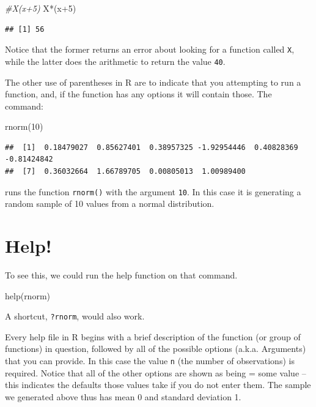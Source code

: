 \documentclass[
]{book}
\newenvironment{Shaded}{\begin{snugshade}}{\end{snugshade}}
\newcommand{\CommentTok}[1]{\textcolor[rgb]{0.56,0.35,0.01}{\textit{#1}}}
\newcommand{\DecValTok}[1]{\textcolor[rgb]{0.00,0.00,0.81}{#1}}
\newcommand{\FunctionTok}[1]{\textcolor[rgb]{0.00,0.00,0.00}{#1}}
\newcommand{\NormalTok}[1]{#1}
\newcommand{\SpecialCharTok}[1]{\textcolor[rgb]{0.00,0.00,0.00}{#1}}
\begin{document}
\begin{Shaded}
\begin{Highlighting}[]
\CommentTok{\#X(x+5)}
\NormalTok{X}\SpecialCharTok{*}\NormalTok{(x}\SpecialCharTok{+}\DecValTok{5}\NormalTok{)}
\end{Highlighting}
\end{Shaded}

\begin{verbatim}
## [1] 56
\end{verbatim}

Notice that the former returns an error about looking for a function called \texttt{X}, while the latter does the arithmetic to return the value \texttt{40}.

The other use of parentheses in R are to indicate that you attempting to run a function, and, if the function has any options it will contain those. The command:

\begin{Shaded}
\begin{Highlighting}[]
\FunctionTok{rnorm}\NormalTok{(}\DecValTok{10}\NormalTok{)}
\end{Highlighting}
\end{Shaded}

\begin{verbatim}
##  [1]  0.18479027  0.85627401  0.38957325 -1.92954446  0.40828369 -0.81424842
##  [7]  0.36032664  1.66789705  0.00805013  1.00989400
\end{verbatim}

runs the function \texttt{rnorm()} with the argument \texttt{10}. In this case it is generating a random sample of 10 values from a normal distribution.

\hypertarget{help}{%
\section{Help!}\label{help}}

To see this, we could run the help function on that command.

\begin{Shaded}
\begin{Highlighting}[]
\FunctionTok{help}\NormalTok{(rnorm)}
\end{Highlighting}
\end{Shaded}

A shortcut, \texttt{?rnorm}, would also work.

Every help file in R begins with a brief description of the function (or group of functions) in question, followed by all of the possible options (a.k.a. Arguments) that you can provide. In this case the value \texttt{n} (the number of observations) is required. Notice that all of the other options are shown as being = some value -- this indicates the defaults those values take if you do not enter them. The sample we generated above thus has mean 0 and standard deviation 1.
\end{document}

